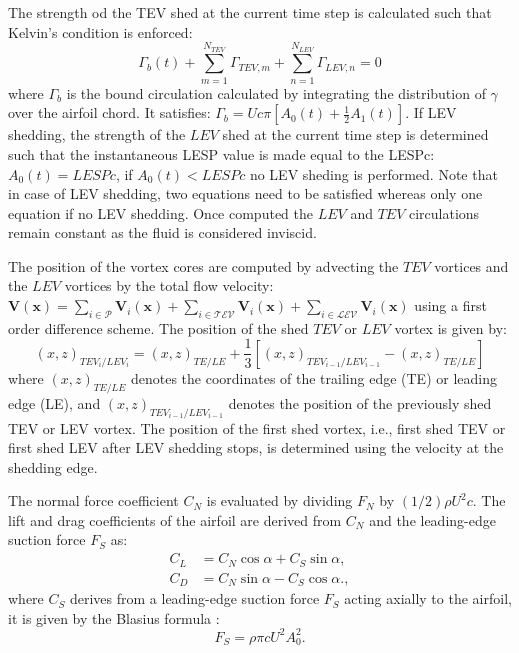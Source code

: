 \documentclass[a4paper,12pt]{article}
\begin{document}
The strength od the TEV shed at the current time step is calculated such that Kelvin’s condition is enforced:
\begin{equation}
    \Gamma_b(t) + \sum_{m=1}^{N_{TEV}} \Gamma_{TEV,m} + \sum_{n=1}^{N_{LEV}} \Gamma_{LEV,n} = 0
    \label{eq:kelvin_circulation}
\end{equation}
where $\Gamma_b$ is the bound circulation calculated by integrating the distribution of $\gamma$ over the airfoil chord. It satisfies:
    $\Gamma_b = U c \pi \left[ A_0(t) + \frac{1}{2} A_1(t) \right]$.
If LEV shedding, the strength  of the $LEV$ shed at the current time step is determined such that  the instantaneous LESP value is made equal to the LESPc: $A_0(t)=LESPc$, if $A_0(t)<LESPc$ no LEV sheding is performed.
Note that in case of LEV shedding, two equations need to be satisfied whereas only one equation if no LEV shedding.
Once computed the $LEV$ and $TEV$ circulations remain constant as the fluid is considered inviscid.

The position of the vortex cores are computed by advecting the $TEV$ vortices and the $LEV$ vortices  by the 
total flow velocity: $\textbf{V}(\textbf{x})= \sum_{i\in \mathcal{P}} \textbf{V}_{i}(\textbf{x}) + \sum_{i\in \mathcal{TEV}} \textbf{V}_{i}(\textbf{x}) + \sum_{i\in \mathcal{LEV}} \textbf{V}_{i}(\textbf{x})$ using a first order difference scheme.
The position of the shed $TEV$ or $LEV$ vortex is given by:
\begin{equation}
    (x, z)_{TEV_i/LEV_i} = (x, z)_{TE/LE} + \frac{1}{3} \left[ (x, z)_{TEV_{i-1}/LEV_{i-1}} - (x, z)_{TE/LE} \right]
\end{equation}
where $(x, z)_{TE/LE}$ denotes the coordinates of the trailing edge (TE) or leading edge (LE), and $(x, z)_{TEV_{i-1}/LEV_{i-1}}$ denotes the position of the previously shed TEV or LEV vortex. The position of the first shed vortex, i.e., first shed TEV or first shed LEV after LEV shedding stops, is determined using the velocity at the shedding edge.



The normal force coefficient $C_N$ is evaluated by dividing $F_N$ by $(1/2)\rho U^2 c$. The lift and drag coefficients of the airfoil are derived from $C_N$ and the leading-edge suction force $F_S$ as:
\begin{align}
    C_L &= C_N \cos\alpha + C_S \sin\alpha, \label{eq:CL}\\
    C_D &= C_N \sin\alpha - C_S \cos\alpha. \label{eq:CD},
\end{align}
where $C_S$ derives from a leading-edge suction force $F_S$ acting axially to the airfoil, it is given by the Blasius formula \citep{ramesh2014discrete}:
\begin{equation}
    F_S = \rho \pi c U^2 A_0^2.
    \label{eq:FS_blasius}
\end{equation}
\end{document}
